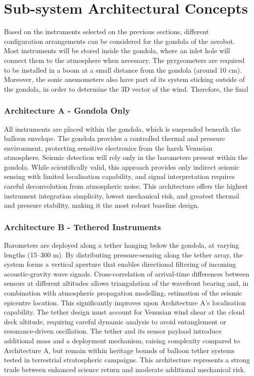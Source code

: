 \normalsize
\section{Sub-system Architectural Concepts}

Based on the instruments selected on the previous sections, different configuration arrangements can be considered for the gondola of the aerobot. Most instruments will be stored inside the gondola, where an inlet hole will connect them to the atmosphere when necessary. The pyrgeometers are required to be installed in a boom at a small distance from the gondola (around 10 cm). Moreover, the sonic anemometers also have part of its system sticking outside of the gondola, in order to determine the 3D vector of the wind. Therefore, the final 



\subsubsection*{Architecture A - Gondola Only}
All instruments are placed within the gondola, which is suspended beneath the balloon envelope. The gondola provides a controlled thermal and pressure environment, protecting sensitive electronics from the harsh Venusian atmosphere. Seismic detection will rely only in the barometers present within the gondola. While scientifically valid, this approach provides only indirect seismic sensing with limited localisation capability, and signal interpretation requires careful deconvolution from atmospheric noise. This architecture offers the highest instrument integration simplicity, lowest mechanical risk, and greatest thermal and pressure stability, making it the most robust baseline design.

\subsubsection*{Architecture B - Tethered Instruments}
Barometers are deployed along a tether hanging below the gondola, at varying lengths (15–300 m). By distributing pressure-sensing along the tether array, the system forms a vertical aperture that enables directional filtering of incoming acoustic-gravity wave signals. Cross-correlation of arrival-time differences between sensors at different altitudes allows triangulation of the wavefront bearing and, in combination with atmospheric propagation modelling, estimation of the seismic epicentre location. This significantly improves upon Architecture A's localisation capability. The tether design must account for Venusian wind shear at the cloud deck altitude, requiring careful dynamic analysis to avoid entanglement or resonance-driven oscillation. The tether and its sensor payload introduce additional mass and a deployment mechanism, raising complexity compared to Architecture A, but remain within heritage bounds of balloon tether systems tested in terrestrial stratospheric campaigns. This architecture represents a strong trade between enhanced science return and moderate additional mechanical risk. 

